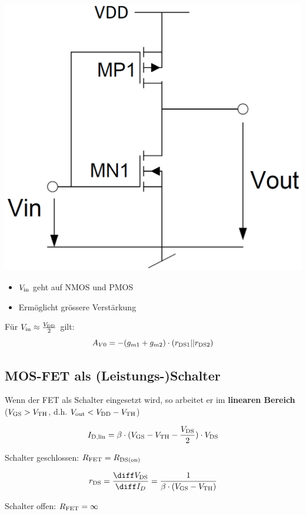 \begin{minipage}[c]{0.35\columnwidth}
    \includegraphics[width=\columnwidth]{images/push_pull_digital_inverter.png}
\end{minipage}
\hfill
\begin{minipage}[c]{0.5\columnwidth}
    \begin{itemize}
        \item $V_{\rm in}$ geht auf NMOS und PMOS
        \item Ermöglicht grössere Verstärkung
    \end{itemize}
        
    \vspace{0.3cm}
    Für $V_{\rm in} \approx \frac{V_{\rm DD}}{2}$ gilt:
    $$ A_{V0} = -(g_{m1} + g_{m2}) \cdot (r_{\rm DS1} || r_{\rm DS2}) $$
\end{minipage}


\subsection{MOS-FET als (Leistungs-)Schalter}
Wenn der FET als Schalter eingesetzt wird, so arbeitet er im \textbf{linearen Bereich} \\
($V_{\rm GS} > V_{\rm TH}$, d.h. $V_{\rm out} < V_{\rm DD} - V_{\rm TH} $)

\begin{minipage}[c]{0.49\columnwidth}
    $$ I_{\rm D,lin} = \beta \cdot ( V_{\rm GS} - V_{\rm TH} - \frac{V_{\rm DS}}{2} ) \cdot V_{\rm DS} $$
    \begin{center}
        
        Schalter geschlossen: $R_{\rm FET} = R_{\rm DS(on)} $
    \end{center}
\end{minipage}
\hfill
\begin{minipage}[c]{0.49\columnwidth}
    $$ r_{\rm DS} = \dfrac{\diff V_{\rm DS}}{\diff I_D} = \frac{1}{\beta \cdot (V_{\rm GS} - V_{\rm TH})}  $$
    \begin{center}
        Schalter offen: $R_{\rm FET} = \infty$ 
    \end{center}
\end{minipage}


